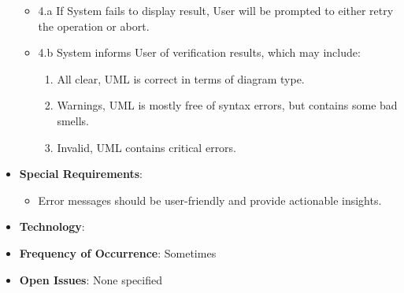 \documentclass[12pt]{article}
\begin{document}
\begin{itemize}
\begin{itemize}
\begin{enumerate}
            \end{enumerate}
            \item 4.a If System fails to display result, User will be prompted to either retry the operation or abort.
            \item 4.b System informs User of verification results, which may include:
            \begin{enumerate}
                \item All clear, UML is correct in terms of diagram type.
                \item Warnings, UML is mostly free of syntax errors, but contains some bad smells\texttrademark.
                \item Invalid, UML contains critical errors.
            \end{enumerate}
        \end{itemize}
        \item \textbf{Special Requirements}:
        \begin{itemize}
            \item Error messages should be user-friendly and provide actionable insights.
        \end{itemize}
        \item \textbf{Technology}:
        \item \textbf{Frequency of Occurrence}: Sometimes
        \item \textbf{Open Issues}: None specified
    \end{itemize}
\end{document}
